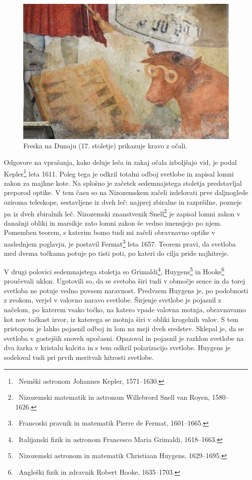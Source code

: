 \begin{figure}[ht]
\centering
\includegraphics[width=9truecm]{slike/01_Dunaj.jpg}
\caption{Freska na Dunaju (17. stoletje) prikazuje kravo z očali.}
\label{fig:01_Dunaj}
\end{figure}

Odgovore na vprašanja, kako deluje leča in zakaj očala izboljšajo vid, je podal
Kepler\footnote{~Nemški astronom Johannes Kepler, 1571--1630.} leta 1611. 
Poleg tega je odkril totalni odboj svetlobe in zapisal lomni zakon za majhne kote.
Na splošno je začetek sedemnajstega stoletja predstavljal preporod optike. 
V tem času so na Nizozemskem začeli izdelovati prve daljnoglede oziroma
teleskope, sestavljene iz dveh leč:
najprej zbiralne in razpršilne, pozneje pa iz dveh zbiralnih leč. 
Nizozemski znanstvenik Snell\footnote{~Nizozemski matematik in astronom Willebrord 
Snell van Royen, 1580--1626.} je zapisal lomni zakon v današnji obliki in 
marsikje zato lomni zakon še vedno imenujejo po njem. Pomemben teorem, s katerim
bomo tudi mi začeli obravnavno optike v naslednjem poglavju, je postavil 
Fermat\footnote{~Francoski pravnik in matematik Pierre de Fermat, 1601--1665.} 
leta 1657. Teorem pravi, da svetloba med dvema točkama potuje po tisti poti, 
po kateri do cilja pride najhitreje.

V drugi polovici sedemnajstega stoletja so Grimaldi\footnote{~Italijanski 
fizik in astronom Francesco Maria Grimaldi, 1618--1663.}, Huygens\footnote{~Nizozemski 
astronom in matematik Christiaan Huygens, 1629--1695.} in Hooke\footnote{~Angleški 
fizik in zdravnik Robert Hooke, 1635--1703.} proučevali uklon. Ugotovili so, da se 
svetoba širi tudi v območje sence in da torej svetloba ne potuje vedno 
povsem naravnost. Predvsem Huygens je, po podobnosti z zvokom, verjel v 
valovno naravo svetlobe. Širjenje svetlobe je pojasnil z načelom, 
po katerem vsako točko, na katero vpade valovna motnja, obravnavamo 
kot nov točkast izvor, iz katerega se motnja širi v obliki krogelnih valov. 
S tem pristopom je lahko pojasnil odboj in lom na meji dveh sredstev. Sklepal je, da
se svetloba v gostejših snoveh upočasni.
Opazoval in pojasnil je razklon svetlobe na dva žarka v kristalu kalcita 
in s tem odkril polarizacijo svetlobe. Huygens je sodeloval tudi pri 
prvih meritvah hitrosti svetlobe. 

